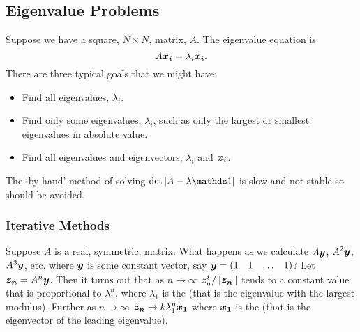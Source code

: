 \documentclass[a4paper]{article}
\begin{document}
    \subsection{Eigenvalue Problems}
    Suppose we have a square, \(N\times N\), matrix, \(A\).
    The eigenvalue equation is
    \[A\bm{x_i} = \lambda_i\bm{x_i}.\]
    There are three typical goals that we might have:
    \begin{itemize}
        \item Find all eigenvalues, \(\lambda_i\).
        \item Find only some eigenvalues, \(\lambda_i\), such as only the largest or smallest eigenvalues in absolute value.
        \item Find all eigenvalues and eigenvectors, \(\lambda_i\) and \(\bm{x_i}\).
    \end{itemize}
    The `by hand' method of solving \(\det\abs{A - \lambda\ident}\) is slow and not stable so should be avoided.
    
    \subsubsection{Iterative Methods}
    Suppose \(A\) is a real, symmetric, matrix.
    What happens as we calculate \(A\bm{y}\), \(A^2\bm{y}\), \(A^3\bm{y}\), etc. where \(\bm{y}\) is some constant vector, say \(\bm{y} = (\begin{matrix}1&1&\dots&1\end{matrix})\)?
    Let \(\bm{z_n}= A^n\bm{y}\).
    Then it turns out that as \(n\to\infty\) \(z_n^i/\norm{\bm{z_n}}\) tends to a constant value that is proportional to \(\lambda_1^n\), where \(\lambda_1\) is the  (that is the eigenvalue with the largest modulus).
    Further as \(n\to\infty\) \(\bm{z_n}\to k\lambda_1^n\bm{x_1}\) where \(\bm{x_1}\) is the  (that is the eigenvector of the leading eigenvalue).
    
\end{document}
